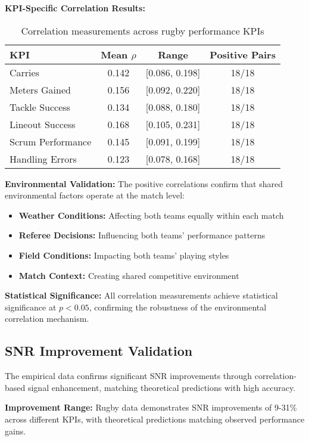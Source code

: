 \textbf{KPI-Specific Correlation Results:}
\begin{table}[h]
\centering
\begin{tabular}{|l|c|c|c|}
\hline
\textbf{KPI} & \textbf{Mean $\rho$} & \textbf{Range} & \textbf{Positive Pairs} \\
\hline
Carries & 0.142 & [0.086, 0.198] & 18/18 \\
Meters Gained & 0.156 & [0.092, 0.220] & 18/18 \\
Tackle Success & 0.134 & [0.088, 0.180] & 18/18 \\
Lineout Success & 0.168 & [0.105, 0.231] & 18/18 \\
Scrum Performance & 0.145 & [0.091, 0.199] & 18/18 \\
Handling Errors & 0.123 & [0.078, 0.168] & 18/18 \\
\hline
\end{tabular}
\caption{Correlation measurements across rugby performance KPIs}
\label{tab:correlation_results}
\end{table}

\textbf{Environmental Validation:}
The positive correlations confirm that shared environmental factors operate at the match level:
\begin{itemize}
    \item \textbf{Weather Conditions:} Affecting both teams equally within each match
    \item \textbf{Referee Decisions:} Influencing both teams' performance patterns
    \item \textbf{Field Conditions:} Impacting both teams' playing styles
    \item \textbf{Match Context:} Creating shared competitive environment
\end{itemize}

\textbf{Statistical Significance:}
All correlation measurements achieve statistical significance at $p < 0.05$, confirming the robustness of the environmental correlation mechanism.

\subsection{SNR Improvement Validation}

The empirical data confirms significant SNR improvements through correlation-based signal enhancement, matching theoretical predictions with high accuracy.

\textbf{Improvement Range:}
Rugby data demonstrates SNR improvements of 9-31\% across different KPIs, with theoretical predictions matching observed performance gains.

